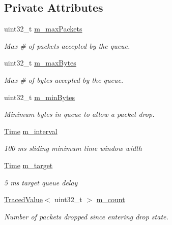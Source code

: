 \subsection*{Private Attributes}
\begin{DoxyCompactItemize}
\item 
uint32\+\_\+t \hyperlink{classns3_1_1CoDelQueueDisc_a806f6d4be982deffa2369d21765ab7ae}{m\+\_\+max\+Packets}
\begin{DoxyCompactList}\small\item\em Max \# of packets accepted by the queue. \end{DoxyCompactList}\item 
uint32\+\_\+t \hyperlink{classns3_1_1CoDelQueueDisc_aaedc40bf84fcee585be0e9cf3c98f33d}{m\+\_\+max\+Bytes}
\begin{DoxyCompactList}\small\item\em Max \# of bytes accepted by the queue. \end{DoxyCompactList}\item 
uint32\+\_\+t \hyperlink{classns3_1_1CoDelQueueDisc_a508ecc494f78426c539caa21c7109bc2}{m\+\_\+min\+Bytes}
\begin{DoxyCompactList}\small\item\em Minimum bytes in queue to allow a packet drop. \end{DoxyCompactList}\item 
\hyperlink{classns3_1_1Time}{Time} \hyperlink{classns3_1_1CoDelQueueDisc_af347ae81576ce27b3f06d015f9422ec1}{m\+\_\+interval}
\begin{DoxyCompactList}\small\item\em 100 ms sliding minimum time window width \end{DoxyCompactList}\item 
\hyperlink{classns3_1_1Time}{Time} \hyperlink{classns3_1_1CoDelQueueDisc_aa9cb41f0fc76d917b4648ac9da7e9ae3}{m\+\_\+target}
\begin{DoxyCompactList}\small\item\em 5 ms target queue delay \end{DoxyCompactList}\item 
\hyperlink{classns3_1_1TracedValue}{Traced\+Value}$<$ uint32\+\_\+t $>$ \hyperlink{classns3_1_1CoDelQueueDisc_a87a17c1b3df276df0a43a4270ee6515c}{m\+\_\+count}
\begin{DoxyCompactList}\small\item\em Number of packets dropped since entering drop state. \end{DoxyCompactList}\item 

\end{DoxyCompactItemize}
